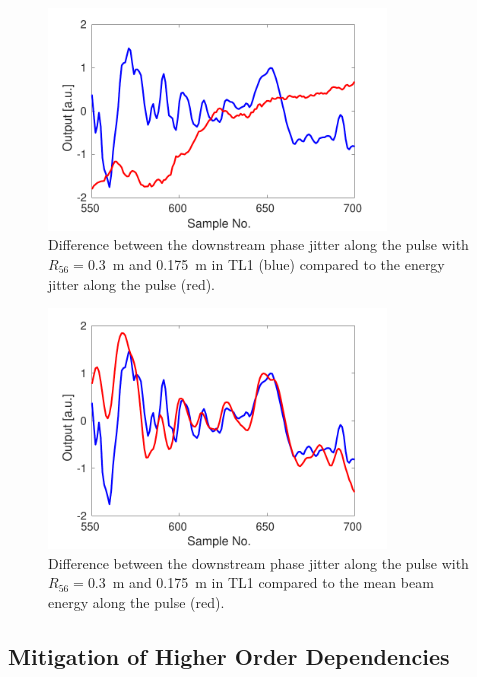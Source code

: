 \begin{figure}
  \centering
  \includegraphics[width=0.8\textwidth]{Figures/propagation/stdPhaseVsStdEnergyAlong}
  \caption{Difference between the downstream phase jitter along the pulse with \(R_{56} = 0.3\)~m and 0.175~m in TL1 (blue) compared to the energy jitter along the pulse (red).}
  \label{f:stdPhaseVsStdEnergyAlong}
\end{figure}

\begin{figure}
  \centering
  \includegraphics[width=0.8\textwidth]{Figures/propagation/stdPhaseVsMeanEnergyAlong}
  \caption{Difference between the downstream phase jitter along the pulse with \(R_{56} = 0.3\)~m and 0.175~m in TL1 compared to the mean beam energy along the pulse (red).}
  \label{f:stdPhaseVsMeanEnergyAlong}
\end{figure}

\subsection{Mitigation of Higher Order Dependencies}
\label{ss:t566Mitigation}

